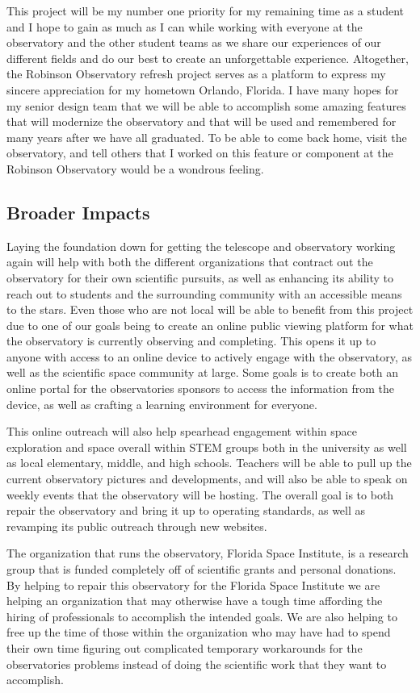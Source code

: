 \documentclass[12pt]{report}
\begin{document}
This project will be my number one priority for my remaining time as a student and I hope to gain as much as I can while working with everyone at the observatory and the other student teams as we share our experiences of our different fields and do our best to create an unforgettable experience.  Altogether, the Robinson Observatory refresh project serves as a platform to express my sincere appreciation for my hometown Orlando, Florida. I have many hopes for my senior design team that we will be able to accomplish some amazing features that will modernize the observatory and that will be used and remembered for many years after we have all graduated.  To be able to come back home, visit the observatory, and tell others that I worked on this feature or component at the Robinson Observatory would be a wondrous feeling.

\subsection*{Broader Impacts}

Laying the foundation down for getting the telescope and observatory working again will help with both the different organizations that contract out the observatory for their own scientific pursuits, as well as enhancing its ability to reach out to students and the surrounding community with an accessible means to the stars. Even those who are not local will be able to benefit from this project due to one of our goals being to create an online public viewing platform for what the observatory is currently observing and completing. This opens it up to anyone with access to an online device to actively engage with the observatory, as well as the scientific space community at large. Some goals is to create both an online portal for the observatories sponsors to access the information from the device, as well as crafting a learning environment for everyone.

This online outreach will also help spearhead engagement within space exploration and space overall within STEM groups both in the university as well as local elementary, middle, and high schools. Teachers will be able to pull up the current observatory pictures and developments, and will also be able to speak on weekly events that the observatory will be hosting. The overall goal is to both repair the observatory and bring it up to operating standards, as well as revamping its public outreach through new websites.

The organization that runs the observatory, Florida Space Institute, is a research group that is funded completely off of scientific grants and personal donations. By helping to repair this observatory for the Florida Space Institute we are helping an organization that may otherwise have a tough time affording the hiring of professionals to accomplish the intended goals. We are also helping to free up the time of those within the organization who may have had to spend their own time figuring out complicated temporary workarounds for the observatories problems instead of doing the scientific work that they want to accomplish. 
\end{document}
